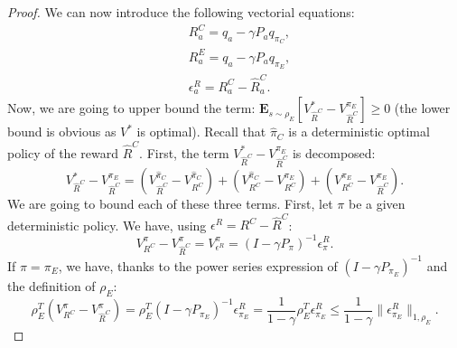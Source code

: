 \documentclass[smallextended]{svjour3}
\newcommand{\E}{\mathbf{E}}
\begin{document}
\begin{proof}
We can now introduce the following vectorial equations:
\begin{align}
&R^C_a=q_a-\gamma P_aq_{\pi_C},
\\
&R^E_a=q_a-\gamma P_aq_{\pi_E},
\\
&\epsilon^R_a=R^C_a-\hat{R}^C_a.
\end{align}
Now, we are going to upper bound the term: $\E_{s\sim\rho_E}[V^*_{\hat{R}^C}-V^{\pi_E}_{\hat{R}^C}]\geq0$ (the lower bound is obvious as $V^*$ is optimal).
Recall that $\hat{\pi}_C$ is a deterministic optimal policy of the reward $\hat{R}^C$. First, the term $V^*_{\hat{R}^C}-V^{\pi_E}_{\hat{R}^C}$ is decomposed:
\begin{equation}
V^*_{\hat{R}^C}-V^{\pi_E}_{\hat{R}^C}=(V^{\hat{\pi}_C}_{\hat{R}^C}-V^{\hat{\pi}_C}_{R^C})+(V^{\hat{\pi}_C}_{R^C}-V^{\pi_E}_{R^C})+(V^{\pi_E}_{R^C}-V^{\pi_E}_{\hat{R}^C}).
\end{equation}
We are going to bound each of these three terms. First, let $\pi$ be a given deterministic policy. We have, using $\epsilon^R = R^C - \hat R^C$:
\begin{equation}
V^{\pi}_{R^C}-V^{\pi}_{\hat{R}^C}=V^{\pi}_{\epsilon^R}=(I-\gamma P_\pi)^{-1}\epsilon^R_{\pi}.
\end{equation}
If $\pi=\pi_E$, we have, thanks to the power series expression of $(I-\gamma P_{\pi_E})^{-1}$ and the definition of $\rho_E$:
\begin{equation}
  \rho_E^T(V^{\pi}_{R^C}-V^{\pi}_{\hat{R}^C})=\rho_E^T(I-\gamma P_{\pi_E})^{-1}\epsilon^R_{\pi_E}=\frac{1}{1-\gamma}\rho_E^T\epsilon^R_{\pi_E}\leq\frac{1}{1-\gamma}\|\epsilon^R_{\pi_E}\|_{1,\rho_E}.\end{equation}


\end{proof}
\end{document}
